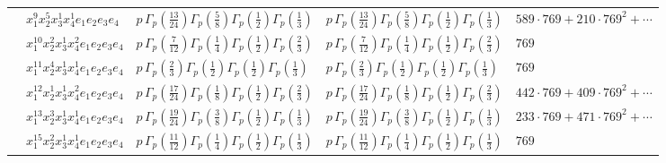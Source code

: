 \documentclass[11pt]{article}
\begin{document}
\begin{table}[ht]
{\begin{tabular}{@{}lllll@{}}
 & $x_{1}^{9} x_{2}^{5} x_{3}^{1} x_{4}^{1}  e_{1} e_{2} e_{3} e_{4}$ & $p \, \Gamma_p \left( \frac{13}{24} \right) \Gamma_p \left( \frac{5}{8} \right) \Gamma_p \left( \frac{1}{2} \right) \Gamma_p \left( \frac{1}{3} \right)$ & $p \, \Gamma_p \left( \frac{13}{24} \right) \Gamma_p \left( \frac{5}{8} \right) \Gamma_p \left( \frac{1}{2} \right) \Gamma_p \left( \frac{1}{3} \right)$ & $589{\cdot}769{+}210{\cdot}769^{2}{+}\cdots$ \\
 & $x_{1}^{10} x_{2}^{2} x_{3}^{1} x_{4}^{2}  e_{1} e_{2} e_{3} e_{4}$ & $p \, \Gamma_p \left( \frac{7}{12} \right) \Gamma_p \left( \frac{1}{4} \right) \Gamma_p \left( \frac{1}{2} \right) \Gamma_p \left( \frac{2}{3} \right)$ & $p \, \Gamma_p \left( \frac{7}{12} \right) \Gamma_p \left( \frac{1}{4} \right) \Gamma_p \left( \frac{1}{2} \right) \Gamma_p \left( \frac{2}{3} \right)$ & $769$ \\
 & $x_{1}^{11} x_{2}^{4} x_{3}^{1} x_{4}^{1}  e_{1} e_{2} e_{3} e_{4}$ & $p \, \Gamma_p \left( \frac{2}{3} \right) \Gamma_p \left( \frac{1}{2} \right) \Gamma_p \left( \frac{1}{2} \right) \Gamma_p \left( \frac{1}{3} \right)$ & $p \, \Gamma_p \left( \frac{2}{3} \right) \Gamma_p \left( \frac{1}{2} \right) \Gamma_p \left( \frac{1}{2} \right) \Gamma_p \left( \frac{1}{3} \right)$ & $769$ \\
 & $x_{1}^{12} x_{2}^{1} x_{3}^{1} x_{4}^{2}  e_{1} e_{2} e_{3} e_{4}$ & $p \, \Gamma_p \left( \frac{17}{24} \right) \Gamma_p \left( \frac{1}{8} \right) \Gamma_p \left( \frac{1}{2} \right) \Gamma_p \left( \frac{2}{3} \right)$ & $p \, \Gamma_p \left( \frac{17}{24} \right) \Gamma_p \left( \frac{1}{8} \right) \Gamma_p \left( \frac{1}{2} \right) \Gamma_p \left( \frac{2}{3} \right)$ & $442{\cdot}769{+}409{\cdot}769^{2}{+}\cdots$ \\
 & $x_{1}^{13} x_{2}^{3} x_{3}^{1} x_{4}^{1}  e_{1} e_{2} e_{3} e_{4}$ & $p \, \Gamma_p \left( \frac{19}{24} \right) \Gamma_p \left( \frac{3}{8} \right) \Gamma_p \left( \frac{1}{2} \right) \Gamma_p \left( \frac{1}{3} \right)$ & $p \, \Gamma_p \left( \frac{19}{24} \right) \Gamma_p \left( \frac{3}{8} \right) \Gamma_p \left( \frac{1}{2} \right) \Gamma_p \left( \frac{1}{3} \right)$ & $233{\cdot}769{+}471{\cdot}769^{2}{+}\cdots$ \\
 & $x_{1}^{15} x_{2}^{2} x_{3}^{1} x_{4}^{1}  e_{1} e_{2} e_{3} e_{4}$ & $p \, \Gamma_p \left( \frac{11}{12} \right) \Gamma_p \left( \frac{1}{4} \right) \Gamma_p \left( \frac{1}{2} \right) \Gamma_p \left( \frac{1}{3} \right)$ & $p \, \Gamma_p \left( \frac{11}{12} \right) \Gamma_p \left( \frac{1}{4} \right) \Gamma_p \left( \frac{1}{2} \right) \Gamma_p \left( \frac{1}{3} \right)$ & $769$ \\

\end{tabular}}
\end{table}
\end{document}
